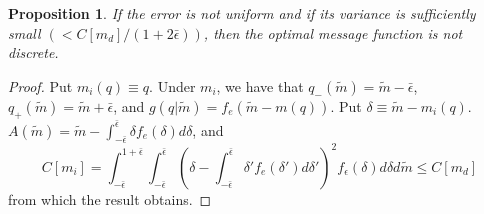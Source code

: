 \documentclass[12pt]{article}
\newtheorem{proposition}{Proposition}
\begin{document}
\begin{proposition}\label{prop:discreteisnotoptimal}
If the error is not uniform and if its variance is sufficiently small $(<C[m_{d}]/(1+2\bar{\epsilon}))$, then the optimal message function is not discrete. 
\end{proposition}
\begin{proof}
Put $m_{i}(q)\equiv q$. Under $m_{i}$, we have that $q_{-}(\widetilde{m})=\widetilde{m}-\bar{\epsilon}$, $q_{+}(\widetilde{m})=\widetilde{m}+\bar{\epsilon}$, and $g(q|\widetilde{m})=f_{e}(\widetilde{m}-m(q))$. Put $\delta\equiv\widetilde{m}-m_{i}(q)$. $A(\widetilde{m})=\widetilde{m}-\int_{-\bar{\epsilon}}^{\bar{\epsilon}}{\delta f_{e}(\delta)d\delta}$, and 
\begin{equation}
C[m_{i}]=\int_{-\bar{\epsilon}}^{1+\bar{\epsilon}}{\int_{-\bar{\epsilon}}^{\bar{\epsilon}}{\left(\delta-\int_{-\bar{\epsilon}}^{\bar{\epsilon}}{\delta' f_{e}(\delta')d\delta'}\right)^{2}f_{\epsilon}(\delta)d\delta}d\widetilde{m}}\leq C[m_{d}]
\end{equation}
from which the result obtains.
\end{proof}
\end{document}
